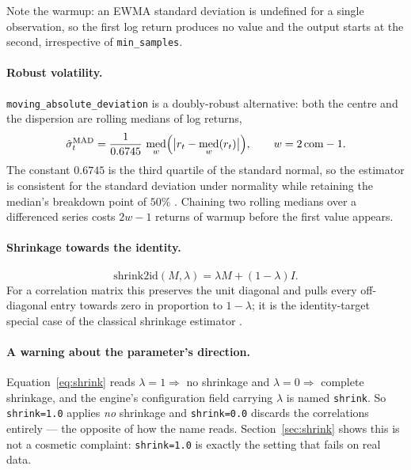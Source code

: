 \documentclass[11pt,a4paper]{article}
\newcommand{\code}[1]{\texttt{#1}}
\DeclareMathOperator{\med}{med}
\begin{document}
Note the warmup: an EWMA standard deviation is undefined for a single
observation, so the first log return produces no value and the output starts at
the second, irrespective of \code{min\_samples}.

\paragraph{Robust volatility.}
\code{moving\_absolute\_deviation} is a doubly-robust alternative: both the
centre and the dispersion are rolling medians of log returns,
\begin{equation}
  \hat\sigma^{\mathrm{MAD}}_t
  = \frac{1}{0.6745} \,
    \med_{w}\Bigl( \bigl| r_t - \med_{w}(r_t) \bigr| \Bigr),
  \qquad w = 2\,\mathrm{com} - 1 .
\end{equation}
The constant $0.6745$ is the third quartile of the standard normal, so the
estimator is consistent for the standard deviation under normality while
retaining the median's breakdown point of $50\%$ \citep{huber2009}. Chaining two
rolling medians over a differenced series costs $2w - 1$ returns of warmup before
the first value appears.

\paragraph{Shrinkage towards the identity.}
\begin{equation}
  \mathrm{shrink2id}(M, \lambda) = \lambda M + (1-\lambda) I .
  \label{eq:shrink}
\end{equation}
For a correlation matrix this preserves the unit diagonal and pulls every
off-diagonal entry towards zero in proportion to $1-\lambda$; it is the
identity-target special case of the classical shrinkage estimator
\citep{ledoit2004}.

\paragraph{A warning about the parameter's direction.}
Equation~\eqref{eq:shrink} reads $\lambda = 1 \Rightarrow$ no shrinkage and
$\lambda = 0 \Rightarrow$ complete shrinkage, and the engine's configuration
field carrying $\lambda$ is named \code{shrink}. So \code{shrink=1.0} applies
\emph{no} shrinkage and \code{shrink=0.0} discards the correlations entirely ---
the opposite of how the name reads. Section~\ref{sec:shrink} shows this is not a
cosmetic complaint: \code{shrink=1.0} is exactly the setting that fails on real
data.
\end{document}

